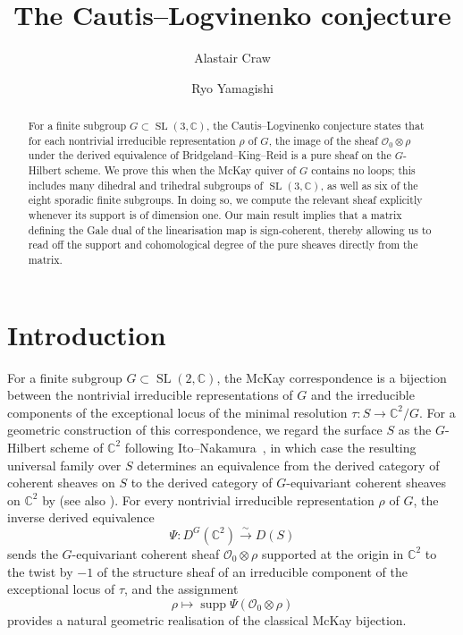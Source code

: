 \documentclass[11pt,reqno]{amsart}
\title{The Cautis--Logvinenko conjecture}
\author{Alastair Craw}
\author{Ryo Yamagishi}
\numberwithin{equation}{section}
\theoremstyle{definition}
\newcommand{\CC}{\ensuremath{\mathbb{C}}}
\newcommand{\0}{\operatorname{0}}
\newcommand{\SL}{\operatorname{SL}}
\newcommand{\supp}{\operatorname{supp}}
\begin{document}
\begin{abstract}
 For a finite subgroup $G\subset \SL(3,\CC)$, the Cautis--Logvinenko conjecture states that for each nontrivial irreducible representation $\rho$ of $G$, the image of the sheaf $\mathcal{O}_0\otimes \rho$ under the derived equivalence of Bridgeland--King--Reid is a pure sheaf on the $G$-Hilbert scheme. We prove this when the McKay quiver of $G$ contains no loops; this includes many dihedral and trihedral subgroups of $\SL(3,\CC)$, as well as six of the eight sporadic finite subgroups. In doing so, we compute the relevant sheaf explicitly whenever its support is of dimension one. Our main result implies that a matrix defining the Gale dual of the linearisation map is sign-coherent, thereby allowing us to read off the support and cohomological degree of the pure sheaves directly from the matrix. 
\end{abstract}

 \maketitle
 

\section{Introduction}
   For a finite subgroup $G\subset \SL(2,\mathbb{C})$, the McKay correspondence \cite{McKay80} is a bijection between the nontrivial irreducible representations of $G$ and the irreducible components of the exceptional locus of the minimal resolution $\tau\colon S\to \mathbb{C}^2/G$. For a geometric construction of this correspondence, we regard the surface $S$ as the $G$-Hilbert scheme of $\mathbb{C}^2$ following Ito--Nakamura~\cite{ItoNakamura99}, in which case the resulting universal family over $S$ determines an equivalence from the derived category of coherent sheaves on $S$ to the derived category of $G$-equivariant coherent sheaves on $\mathbb{C}^2$ by \cite{KV00} (see also \cite{BKR01}). For every nontrivial irreducible representation $\rho$ of $G$, the inverse derived equivalence
 \[
 \Psi\colon D^G(\mathbb{C}^2)\stackrel{\sim}{\longrightarrow} D(S)
 \]
 sends the $G$-equivariant coherent sheaf $\mathcal{O}_0\otimes \rho$ supported at the origin in $\mathbb{C}^2$ to the twist by $-1$ of the structure sheaf of an irreducible component of the exceptional locus of $\tau$, and the assignment
 \begin{equation}
     \label{eqn:geometricMcKay}
\rho \longmapsto \supp\Psi(\mathcal{O}_{0}\otimes \rho)
  \end{equation}
 provides a natural geometric realisation of the classical McKay bijection.
   
\end{document}
